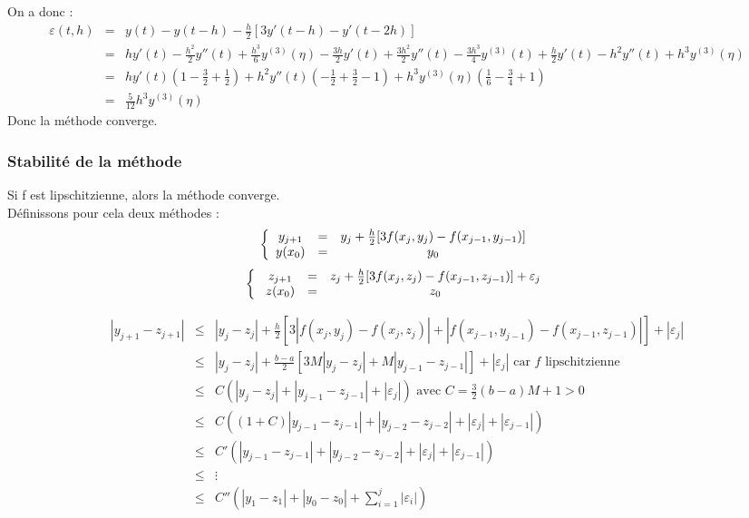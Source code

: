 On a donc :
\begin{eqnarray*}
	\varepsilon(t,h)&=&y(t)-y(t-h)-\frac{h}{2}[3y'(t-h)-y'(t-2h)]\\
			&=&hy'(t)-\frac{h^2}{2}y''(t)+\frac{h^3}{6}y^{(3)}(\eta)
	-\frac{3h}{2}y'(t) + \frac{3h^2}{2}y''(t) - \frac{3h^3}{4}y^{(3)}(t)
	+\frac{h}{2}y'(t)-h^2y''(t)+h^3y^{(3)}(\eta)\\
			&=&hy'(t)\left( 1-\frac{3}{2}+\frac{1}{2}\right) + h^2y''(t)\left( -\frac{1}{2} + \frac{3}{2}-1\right) 
	+ h^3y^{(3)}(\eta)\left(\frac{1}{6}-\frac{3}{4}+1\right) \\
			&=&\frac{5}{12}h^3y^{(3)}(\eta)
\end{eqnarray*}
Donc la méthode converge.

\subsubsection{Stabilité de la méthode}
Si f est lipschitzienne, alors la méthode converge.\\
Définissons pour cela deux méthodes :
\[\left\{ \begin{array}{c c c}
	y_{j+1} &=& y_j + \frac{h}{2}[3f(x_j,y_j)-f(x_{j-1},y_{j-1})]\\
	y(x_0) &=& y_0
\end{array}\right.\]
\[\left\{ \begin{array}{c c c}
	z_{j+1} &=& z_j + \frac{h}{2}[3f(x_j,z_j)-f(x_{j-1},z_{j-1})]+ \varepsilon_j\\
	z(x_0) &=& z_0
\end{array}\right.\]

\begin{eqnarray*}
	|y_{j+1}-z_{j+1}| &\leq& |y_j-z_j| + \frac{h}{2}[3|f(x_j,y_j)-f(x_j,z_j)| + |f(x_{j-1},y_{j-1})-f(x_{j-1},z_{j-1})|]+|\varepsilon_j| \\
	&\leq& |y_j-z_j| + \frac{b-a}{2}[3M|y_j-z_j| + M|y_{j-1}-z_{j-1}|]+|\varepsilon_j| \text{ car } f \text{ lipschitzienne} \\
	&\leq& C(|y_j-z_j|+ |y_{j-1}-z_{j-1}| + |\varepsilon_j|) \text{ avec } C = \frac{3}{2}(b-a)M+1 > 0 \\
	&\leq& C((1+C)|y_{j-1}-z_{j-1}| + |y_{j-2}-z_{j-2}| + |\varepsilon_j| + |\varepsilon_{j-1}|) \\
	&\leq& C'(|y_{j-1}-z_{j-1}| + |y_{j-2}-z_{j-2}| + |\varepsilon_j| + |\varepsilon_{j-1}|) \\
	&\leq& \vdots \\
	&\leq& C''\left(|y_1-z_1| + |y_0-z_0| + \sum_{i=1}^j |\varepsilon_i|\right) \\
\end{eqnarray*}

